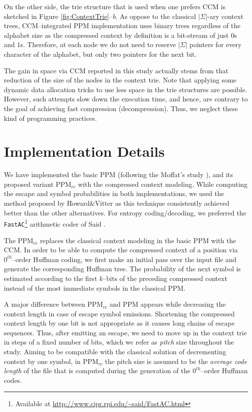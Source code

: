 \documentclass[runningheads,a4paper]{llncs}
\begin{document}
On the other side, the trie structure that is used when one prefers CCM is sketched in Figure 
\ref{fig:ContextTrie}--\emph{b}. 
As oppose to the classical $|\Sigma|$-ary context trees, CCM--integrated PPM implementation uses binary trees regardless
of the alphabet size as the compressed context by definition is a bit-stream of just $0$s and $1$s. 
Therefore, at each node we do not need to reserve $|\Sigma|$ pointers for every character of the alphabet, but only two
pointers for the next bit.

The gain in space via CCM reported in this study actually stems from that reduction of the size of the nodes in the
context trie. 
Note that applying some dynamic data allocation tricks to use less space in the trie structures are possible. However,
such attempts slow down the execution time, and hence, are contrary to the goal of achieving fast compression 
(decompression).
Thus, we neglect these kind of programming practices.

\section{Implementation Details}

We have implemented the basic PPM (following the Moffat's study \cite{Moffat90}), and its proposed variant PPM$_{cc}$
with the compressed context modeling. 
While computing the escape and symbol probabilities in both implementations, we used the method proposed by
Howard\&Vitter \cite{HV92} as this technique consistently achieved better than the other alternatives. 
For entropy coding/decoding, we preferred the \texttt{FastAC}\footnote{Available at
\url{http://www.cipr.rpi.edu/~said/FastAC.html}} arithmetic coder of Said \cite{said2004introduction}. 

The PPM$_{cc}$ replaces the classical context modeling in the basic PPM with the CCM. 
In order to be able to compute the compressed context of a position via $0^{th}$--order Huffman coding, we first make
an initial pass over the input file and generate the corresponding Huffman tree. 
The probability of the next symbol is estimated according to the first $k$--bits of the preceding compressed context
instead of the most immediate symbols in the classical PPM.  

A major difference between PPM$_{cc}$ and PPM appears while decreasing the context length in case of escape symbol
emissions. Shortening the compressed context length by one bit is not appropriate as it causes long chains of escape
sequences. Thus, after emitting an escape, we need to move up in the context trie in steps of a fixed number of bits,
which we refer as \emph{pitch} size throughout the study. 
Aiming to be compatible with the classical solution of decrementing context by one symbol, in PPM$_{cc}$ the pitch size
is assumed to be the \emph{average code length} of the file that is computed during the generation of the
$0^{th}$--order Huffman codes. 
\end{document}
